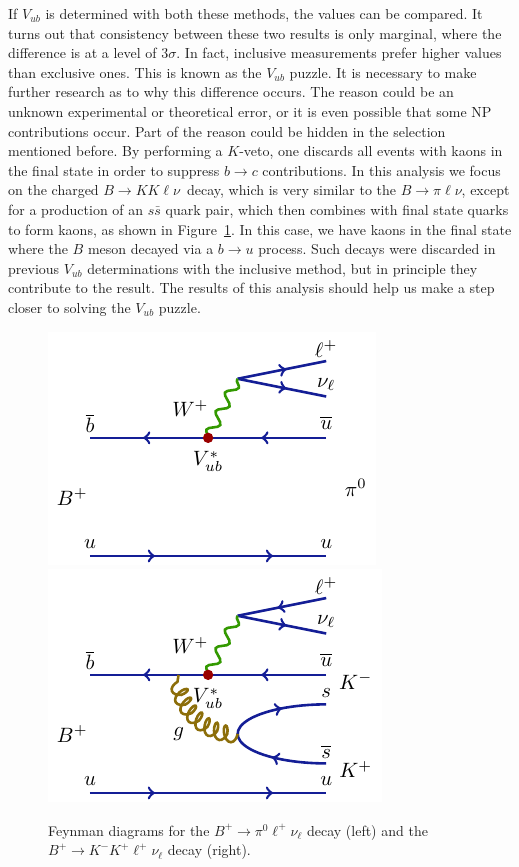 \documentclass[headings=standardclasses,headings=big,oneside,a4paper,openany,12pt]{scrbook}
\newcommand {\decaya}{$B \rightarrow K K \ell \nu$}
\begin{document}
If $V_{ub}$ is determined with both these methods, the values can be compared. It turns out that consistency between these two results is only marginal, where the difference is at a level of $3\sigma$. In fact, inclusive measurements prefer higher values than exclusive ones. This is known as the $V_{ub}$ puzzle. It is necessary to make further research as to why this difference occurs. The reason could be an unknown experimental or theoretical error, or it is even possible that some NP contributions occur. Part of the reason could be hidden in the selection mentioned before. By performing a $K$-veto, one discards all events with kaons in the final state in order to suppress $b \rightarrow c$ contributions. In this analysis we focus on the charged \decaya~decay, which is very similar to the $B \rightarrow \pi \ell \nu$, except for a production of an $s \bar s$ quark pair, which then combines with final state quarks to form kaons, as shown in Figure~\ref{feynman}. In this case, we have kaons in the final state where the $B$ meson decayed via a $b \rightarrow u$ process. Such decays were discarded in previous $V_{ub}$ determinations with the inclusive method, but in principle they contribute to the result. The results of this analysis should help us make a step closer to solving the $V_{ub}$ puzzle. 

\begin{figure}[H]
\centering
\includegraphics{texfig/B2pilnu}
\hspace{1cm}
\includegraphics{texfig/B2KKlnu}
\caption{Feynman diagrams for the $B^+ \to \pi^0 \ell^+ \nu_\ell$ decay (left) and the $B^+ \to K^- K^+ \ell^+ \nu_\ell$ decay (right).}
\label{feynman}
\end{figure}
\end{document}
